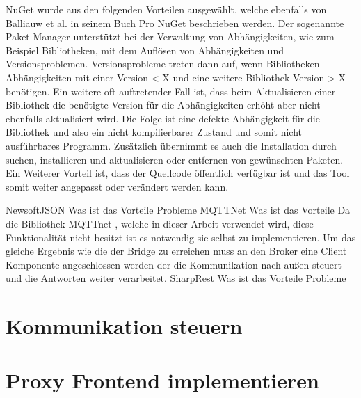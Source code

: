     
    NuGet wurde aus den folgenden Vorteilen ausgewählt, welche ebenfalls von Balliauw et al. in seinem Buch Pro NuGet \cite{balliauw2012pro} beschrieben werden.
    Der sogenannte Paket-Manager unterstützt bei der Verwaltung von Abhängigkeiten, wie zum Beispiel Bibliotheken, mit dem Auflösen von Abhängigkeiten und Versionsproblemen. Versionsprobleme treten dann auf, wenn Bibliotheken Abhängigkeiten mit einer Version < X und eine weitere Bibliothek Version > X benötigen. Ein weitere oft auftretender Fall ist, dass beim Aktualisieren einer Bibliothek die benötigte Version für die Abhängigkeiten erhöht aber nicht ebenfalls aktualisiert wird. Die Folge ist eine defekte Abhängigkeit für die Bibliothek und also ein nicht kompilierbarer Zustand  und somit nicht ausführbares Programm. Zusätzlich übernimmt es auch die Installation durch suchen, installieren und aktualisieren oder entfernen von gewünschten Paketen. Ein Weiterer Vorteil ist, dass der Quellcode öffentlich verfügbar ist und das Tool somit weiter angepasst oder verändert werden kann.
    
    NewsoftJSON
        Was ist das
        Vorteile
        Probleme
    MQTTNet
        Was ist das
        Vorteile
        Da die Bibliothek MQTTnet \cite{chkr1011_2018},
        welche in dieser Arbeit verwendet wird, diese Funktionalität nicht besitzt ist es notwendig sie selbst zu implementieren. Um das gleiche Ergebnis wie die der Bridge zu erreichen muss an den Broker eine Client Komponente angeschlossen werden der die Kommunikation nach außen steuert und die Antworten weiter verarbeitet. 
    SharpRest
        Was ist das
        Vorteile
        Probleme
    
\section{Kommunikation steuern}

        
\section{Proxy Frontend implementieren}
    
